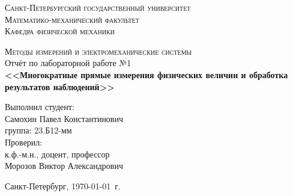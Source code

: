 \begin{titlepage}
\begin{center}
\textsc{Санкт-Петербургский государственный университет\\
Математико-механический факультет\\
Кафедра физической механики\\}

\vfill

\textsc{Методы измерений и электромеханические системы\\[3mm]}
Отчёт по лабораторной работе №1\\[6mm]


\textbf{\large<<Многократные прямые измерения физических величин и обработка результатов наблюдений>>}

\vfill
\end{center}

\hfill
\begin{minipage}{.5\textwidth}
Выполнил студент:\\[2mm] 
Самохин Павел Константинович\\
группа: 23.Б12-мм\\[5mm]

Проверил:\\[2mm] 
к.ф.-м.н., доцент, профессор\\
Морозов Виктор Александрович
\end{minipage}%
\vfill
\begin{center}
 Санкт-Петербург, \yeardate\today\ г.
\end{center}
\end{titlepage}